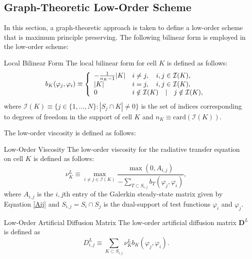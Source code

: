 \subsection{Graph-Theoretic Low-Order Scheme}\label{gtloworder}
In this section, a graph-theoretic approach is taken to define a low-order
scheme that is maximum principle preserving. The following bilinear form
is employed in the low-order scheme:
\begin{definition}{Local Bilinear Form}{}
   The local bilinear form for cell $K$ is defined as follows:
   \begin{equation}\label{bilinearform}
      b_K(\varphi_j, \varphi_i) \equiv \left\{\begin{array}{l l}
         -\frac{1}{n_K - 1}|K| & i\ne j, \quad i,j\in \mathcal{I}(K),\\
         |K|                   & i = j,  \quad i,j\in \mathcal{I}(K),\\
         0                     & i\notin\mathcal{I}(K) \quad | \quad j\notin\mathcal{I}(K),
      \end{array}\right.
   \end{equation}
   where $\mathcal{I}(K)\equiv \{j\in\{1,\ldots,N\}: |S_j\cap K|\ne 0\}$
   is the set of indices corresponding to degrees of freedom in
   the support of cell $K$ and $n_K \equiv \mbox{card}(\mathcal{I}(K))$.
\end{definition}
The low-order viscosity is defined as follows:
\begin{definition}{Low-Order Viscosity}{}
   The low-order viscosity for the radiative transfer equation on cell $K$ is
   defined as follows:
   \begin{equation}
      \nu_K^L \equiv \max\limits_{i\ne j\in \mathcal{I}(K)}\frac{\max(0,A_{i,j})}
         {-\sum\limits_{T\subset S_{i,j}} b_T(\varphi_j, \varphi_i)},
   \end{equation}
   where $A_{i,j}$ is the $i,j$th entry of the Galerkin steady-state
   matrix given by Equation \eqref{Aij} and $S_{i,j}=S_i\cap S_j$ is the
   dual-support of test functions $\varphi_i$ and $\varphi_j$.
\end{definition}
\begin{definition}{Low-Order Artificial Diffusion Matrix}{}
   The low-order artificial diffusion matrix $\mathbf{D}^L$ is defined as
   \begin{equation}\label{loworderdiffusionGT}
      D_{i,j}^L \equiv \sum\limits_{K\subset S_{i,j}}\nu_K^L b_K(\varphi_j,\varphi_i).
   \end{equation}
\end{definition}
